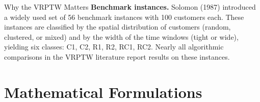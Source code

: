 \documentclass[aspectratio=169,10pt]{beamer}
\begin{document}
\begin{frame}[allowframebreaks]{Why the VRPTW Matters}
\medskip
\textbf{Benchmark instances.}  Solomon (1987) introduced a widely used set of 56
benchmark instances with 100 customers each.  These instances are classified by the
spatial distribution of customers (random, clustered, or mixed) and by the width of
the time windows (tight or wide), yielding six classes: C1, C2, R1, R2, RC1, RC2.
Nearly all algorithmic comparisons in the VRPTW literature report results on these
instances.

\end{frame}

\section{Mathematical Formulations}
\end{document}
